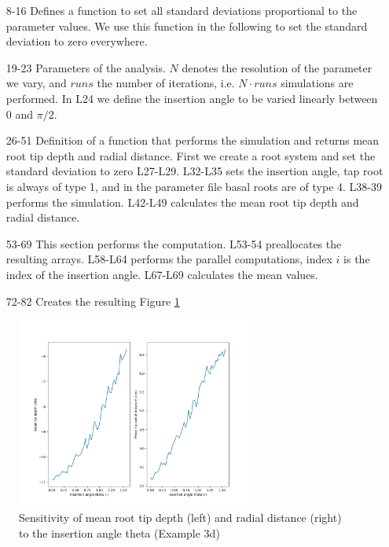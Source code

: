 \documentclass[a4paper]{article}
\begin{document}


\begin{itemize}

\item[8-16] Defines a function to set all standard deviations proportional to the parameter values. We use this function in the following to set the standard deviation to zero everywhere. 

\item[19-23] Parameters of the analysis. $N$ denotes the resolution of the parameter we vary, and $runs$ the number of iterations, i.e. $N\cdot runs$ simulations are performed. 
In L24 we define the insertion angle to be varied linearly between 0 and $\pi/2$.

\item[26-51] Definition of a function that performs the simulation and returns mean root tip depth and radial distance. First we create a root system and set the standard deviation to zero L27-L29. 
L32-L35 sets the insertion angle, tap root is always of type 1, and in the parameter file basal roots are of type 4. L38-39 performs the simulation. 
L42-L49 calculates the mean root tip depth and radial distance. 

\item[53-69] This section performs the computation. L53-54 preallocates the resulting arrays. L58-L64 performs the parallel computations, index $i$ is the index of the insertion angle. L67-L69 calculates the mean values.

\item[72-82] Creates the resulting Figure \ref{fig:sa}

\end{itemize}

\begin{figure}
\centering
\includegraphics[width=0.7\textwidth]{example_3d.png}
\caption{Sensitivity of mean root tip depth (left) and radial distance (right) to the insertion angle theta (Example 3d) } \label{fig:sa}
\end{figure}
\end{document}
